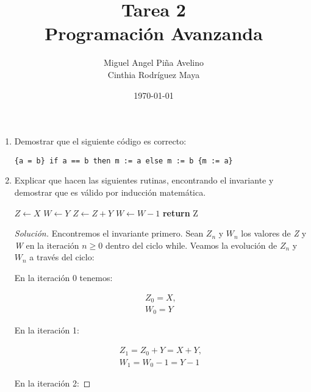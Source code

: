 \documentclass[11pt]{article}
\author{Miguel Angel Piña Avelino\\Cinthia Rodríguez Maya}
\date{\today}
\title{Tarea 2\\Programación Avanzanda}
\begin{document}
\maketitle

\begin{enumerate}

\item Demostrar que el siguiente código es correcto:
\begin{verbatim}
{a = b} if a == b then m := a else m := b {m := a}
\end{verbatim}

\item Explicar que hacen las siguientes rutinas, encontrando el
  invariante y demostrar que es válido por inducción matemática.

  \begin{algorithm}
    \caption{}
    \begin{algorithmic}
      \State $Z \leftarrow X$
      \State $W \leftarrow Y$
      \State $Z \leftarrow Z + Y$
      \State $W \leftarrow W - 1$
      \EndWhile
      \State \textbf{return} Z
      \EndProcedure
    \end{algorithmic}
  \end{algorithm}

  \begin{proof}[Solución]
    Encontremos el invariante primero. Sean $Z_n$ y $W_n$ los valores
    de \textit{Z} y \textit{W} en la iteración $n \ge 0$ dentro del
    ciclo while. Veamos la evolución de $Z_n$ y $W_n$ a través del
    ciclo:

    En la iteración 0 tenemos:

    \begin{equation*}
      \begin{split}
        Z_0 = X,\\ W_0= Y
      \end{split}
    \end{equation*}



    En la iteración 1:

    \begin{equation*}
      \begin{split}
        Z_1 = Z_0 + Y = X + Y,\\W_1 = W_0 - 1 = Y - 1
      \end{split}
    \end{equation*}

    En la iteración 2:


\end{proof}
\end{enumerate}
\end{document}
